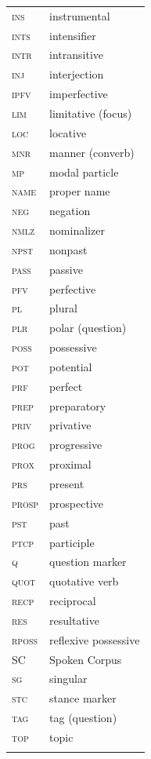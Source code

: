 \documentclass[output=paper,colorlinks,citecolor=brown,chinesefont]{langscibook}
\begin{document}
\begin{tabularx}{.45\textwidth}{lQ}
\scshape ins & instrumental\\
\scshape ints & intensifier\\
\scshape intr & intransitive\\
\scshape inj & interjection\\
\scshape ipfv & imperfective \\
\scshape lim & limitative (focus) \\
\scshape loc & locative \\
\scshape mnr & manner (converb) \\
\scshape mp & modal particle\\
\scshape name & proper name \\
\scshape neg & negation\\
\scshape nmlz & nominalizer\\
\scshape npst & nonpast\\
\scshape pass & passive\\
\scshape pfv & perfective\\
\scshape pl & plural\\
\scshape plr & polar (question) \\
\scshape poss & possessive\\
\scshape pot & potential\\
\scshape prf & perfect\\
\scshape prep & preparatory\\
\scshape priv & privative\\
\scshape prog & progressive\\
\scshape prox & proximal\\
\scshape prs & present\\
\scshape prosp & prospective\\
\scshape pst & past\\
\scshape ptcp & participle\\
\scshape q & question marker\\
\scshape quot & quotative verb\\
\scshape recp & reciprocal\\
\scshape res & resultative \\
\scshape rposs & reflexive possessive\\ 
\scshape SC & Spoken Corpus\\
\scshape sg & singular\\
\scshape stc & stance marker\\
\scshape tag & tag (question) \\
\scshape top & topic\\
\\
\end{tabularx}


\sloppy\printbibliography[heading=subbibliography,notkeyword=this]
\end{document}
